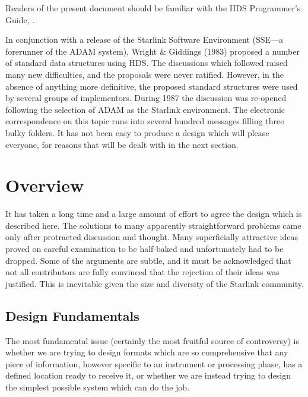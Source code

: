 \documentclass[twoside,11pt,nolof,noabs]{starlink}
\begin{document}
Readers of the present document
should be familiar with the HDS Programmer's Guide, .

In conjunction with a release of
the Starlink Software Environment ({\small SSE}---a forerunner of the
{\small ADAM} system),
Wright \& Giddings (1983) proposed a number of standard data structures
using HDS.  The discussions which followed raised many
new difficulties, and the proposals were never
ratified.  However, in the absence of anything more definitive,
the proposed standard structures were used by several
groups of implementors.  During 1987 the discussion was re-opened
following the selection of {\small ADAM} as the Starlink environment.  The
electronic correspondence on this topic runs into several hundred
messages filling three bulky
folders.  It has not been easy to produce a design which
will please everyone, for reasons that will be dealt with
in the next section.

\section{Overview\label{se:overview}}

It has taken a long time and a large amount of effort
to agree the design which is described here.
The solutions to many apparently
straightforward problems came only after
protracted discussion and
thought.  Many superficially attractive ideas proved on careful
examination to be half-baked and unfortunately had to be dropped.
Some of the arguments are subtle, and it must be acknowledged that
not all contributors are fully convinced that the rejection
of their ideas was justified.  This is inevitable given the
size and diversity of the Starlink community.

\subsection*{Design Fundamentals}
The most fundamental issue (certainly the
most fruitful source of controversy) is whether we are
trying to design formats which are so comprehensive that
any piece of information, however specific to an instrument or
processing phase, has a defined location ready to receive
it, or whether we are instead trying to design
the simplest possible system which can do the job.
\end{document}
